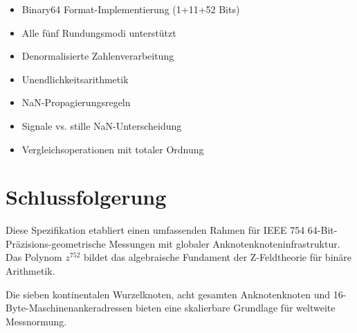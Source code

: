 \documentclass[12pt]{book}
\begin{document}
\begin{itemize}
\item[$\square$] Binary64 Format-Implementierung (1+11+52 Bits)
\item[$\square$] Alle fünf Rundungsmodi unterstützt
\item[$\square$] Denormalisierte Zahlenverarbeitung
\item[$\square$] Unendlichkeitsarithmetik
\item[$\square$] NaN-Propagierungsregeln
\item[$\square$] Signale vs. stille NaN-Unterscheidung
\item[$\square$] Vergleichsoperationen mit totaler Ordnung
\end{itemize}

\backmatter

\chapter*{Schlussfolgerung}

Diese Spezifikation etabliert einen umfassenden Rahmen für IEEE 754 64-Bit-Präzisions-geometrische Messungen mit globaler Anknotenknoteninfrastruktur. Das Polynom $z^{752}$ bildet das algebraische Fundament der Z-Feldtheorie für binäre Arithmetik.

Die sieben kontinentalen Wurzelknoten, acht gesamten Anknotenknoten und 16-Byte-Maschinenankeradressen bieten eine skalierbare Grundlage für weltweite Messnormung.
\end{document}
